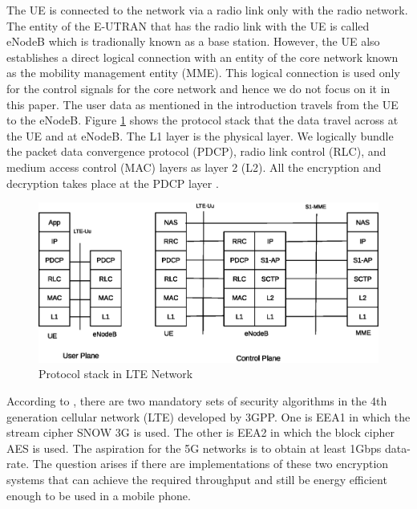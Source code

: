 \documentclass[12pt]{llncs}
\begin{document}
The UE is connected to the network via a radio link only with the radio network. The entity of the E-UTRAN that has the radio link with the UE is called eNodeB which is tradionally known as a base station. However, the UE also establishes a direct logical connection with an entity of the core network known as the mobility management entity (MME). This logical connection is used only for the control signals for the core network and hence we do not focus on it in this paper. The user data as mentioned in the introduction travels from the UE to the eNodeB. Figure \ref{fig:protocl_stack} shows the protocol stack that the data travel across at the UE and at eNodeB. The L1 layer is the physical layer. We logically bundle the packet data convergence protocol (PDCP), radio link control (RLC), and medium access control (MAC) layers as layer 2 (L2). All the encryption and decryption takes place at the PDCP layer \cite{3GPP_TS_36_323}.

\begin{figure}
\begin{center}
  \includegraphics[width=.98\textwidth]{protocol_stack.eps}
\caption{Protocol stack in LTE Network}
\label{fig:protocl_stack}       %
\end{center}
\end{figure}

According to \cite{3GPP_TS_33_401}, there are two mandatory sets of security algorithms in the 4th generation cellular network (LTE) developed by 3GPP. One is EEA1 in which the stream cipher SNOW 3G is used. The other is EEA2 in which the block cipher AES is used. The aspiration for the 5G networks is to obtain at least 1Gbps data-rate. The question arises if there are implementations of these two encryption systems that can achieve the required throughput and still be energy efficient enough to be used in a mobile phone.
\end{document}
